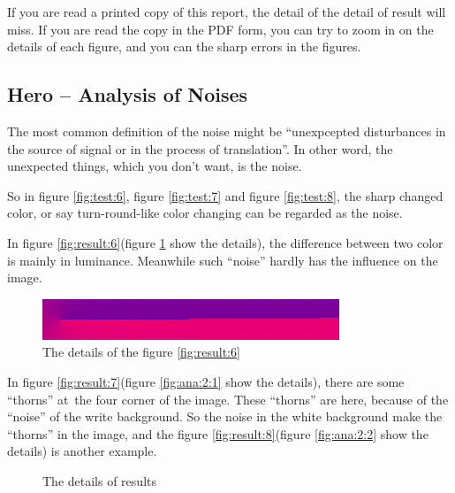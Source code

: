 \documentclass{article}
\begin{document}
If you are read a printed copy of this report, the detail of the detail of result will miss.
If you are read the copy in the PDF form, you can try to zoom in on the details of each figure,
and you can the sharp errors in the figures.


\subsection{Hero -- Analysis of Noises}
\label{sec:test:analysis}

The most common definition of the noise might be ``unexpcepted disturbances in the source of signal 
or in the process of translation''. In other word, the unexpected things, which you don't want,
is the noise.

So in figure \ref{fig:test:6}, figure \ref{fig:test:7} and figure \ref{fig:test:8},
 the sharp changed color, or say turn-round-like color changing can be regarded as the noise.
 
In figure \ref{fig:result:6}(figure \ref{fig:ana:1} show the details), the difference between two color
is mainly in luminance. Meanwhile such ``noise'' hardly has the influence on the image.

\begin{figure}
\centering
\includegraphics[width=0.7\linewidth]{hpeg-test/ana1}
\caption{The details of the figure \ref{fig:result:6}}
\label{fig:ana:1}
\end{figure}

In figure \ref{fig:result:7}(figure \ref{fig:ana:2:1} show the details), there are some ``thorns'' at\
the four corner of the image. These ``thorns'' are here, because of the ``noise'' of the write background.
So the noise in the white background make the ``thorns'' in the image, and the figure \ref{fig:result:8}(figure \ref{fig:ana:2:2} show the details) is another example.

\begin{figure}
    \centering 
    \hspace{0.5in}
    \caption{The details of results}
    \label{fig:ana:2}
\end{figure}
\end{document}
